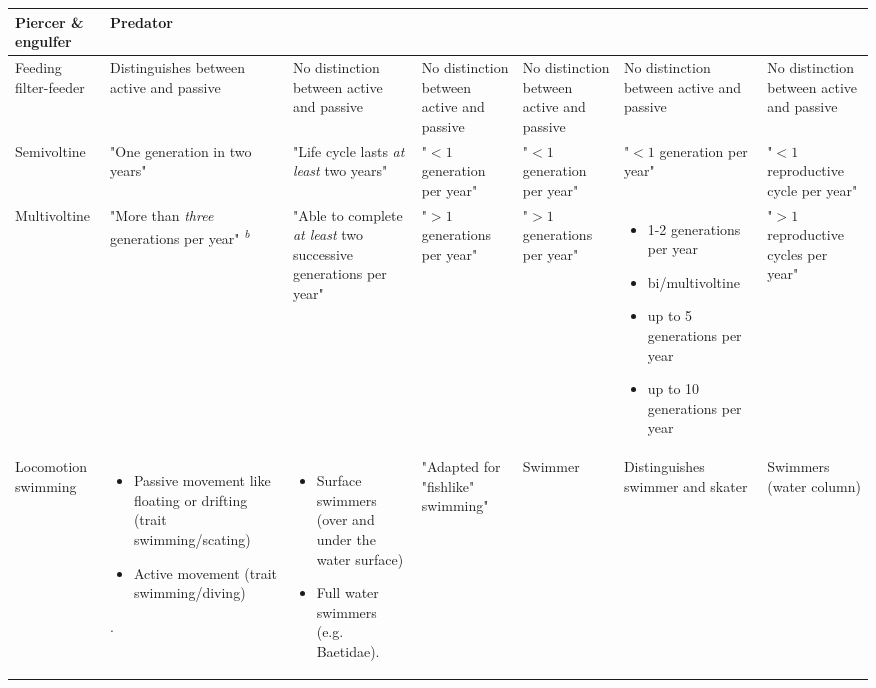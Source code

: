 \documentclass[../Draft_harmonization_paper.tex]{subfiles}
\begin{document}
\begin{landscape}
\begin{longtable}{m{1.7cm}|m{3cm}|m{3cm}|m{3cm}|m{3cm}|m{3cm}|m{3cm}}
        Piercer \& engulfer &
        Predator
        \\ 
        \hline
        Feeding filter-feeder & 
        Distinguishes between active and passive &
        No distinction between active and passive &
        No distinction between active and passive &
        No distinction between active and passive &
        No distinction between active and passive &
        No distinction between active and passive
        \\
        \hline
        \hline
        Semivoltine & 
        "One generation in two years" & 
        "Life cycle lasts \textit{at least} two years" & 
        "$< 1$ generation per year" & 
        "$< 1$ generation per year" & 
        "$< 1$ generation per year" & 
        "$< 1$ reproductive cycle per year"
        \\
        \hline
        Multivoltine & 
        "More than \textit{three} generations per year" \textsuperscript{\textit{b}}& 
        "Able to complete \textit{at least} two successive generations per year" &
        "$> 1$ generations per year" &
        "$> 1$ generations per year" & 
        \begin{itemize}
            \item 1-2 generations per year
            \item bi/multivoltine
            \item up to 5 generations per year
            \item up to 10 generations per year
        \end{itemize}
        & 
        "$> 1$ reproductive cycles per year"
        \\
        \hline
        \hline
        Locomotion swimming & 
        \begin{itemize}
            \item Passive movement like floating or drifting (trait swimming/scating)
            \item Active movement (trait swimming/diving)
        \end{itemize}. &
        \begin{itemize}
            \item Surface swimmers (over and under the water surface)
            \item Full water swimmers (e.g. Baetidae).
        \end{itemize} & 
        "Adapted for "fishlike" swimming" & 
        Swimmer & 
        Distinguishes swimmer and skater & 
        Swimmers (water column)

\end{longtable}
\end{landscape}
\end{document}
